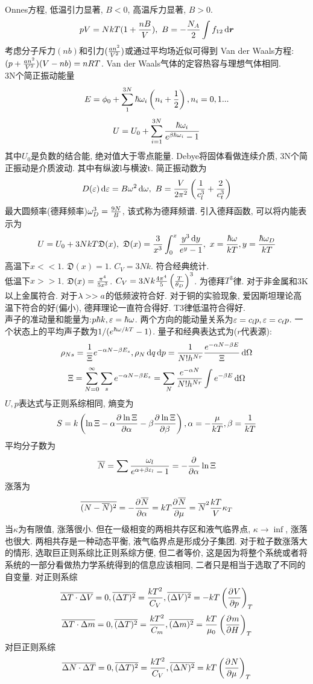 \documentclass[UTF8,9pt]{ctexart}
\newcommand{\q}[1]{{\color{red} #1}}
\begin{document}
Onnes方程, 低温引力显著, $B<0$, 高温斥力显著, $B>0$. 
$$pV=NkT(1+\frac{nB}{V}),\ B=-\frac{N_A}{2}\int f_{12}\mathop{}\!\mathrm{d}\bm{r}$$
考虑分子斥力$(nb)$和引力$(\frac{an^2}{V^2})$或通过平均场近似可得到\q{Van der Waals方程}: $(p+\frac{an^2}{V^2})(V-nb)=nRT$. Van der Waals气体的定容热容与理想气体相同. \\
3N个简正振动能量
$$E=\phi_0+\sum_1^{3N}\hbar\omega_i\left( n_i+\frac{1}{2} \right),n_i=0,1...$$
$$U=U_0+\sum_{i=1}^{3N}\frac{\hbar\omega_i}{e^{\beta\hbar\omega_i}-1}$$
其中$U_0$是负数的结合能, 绝对值大于零点能量. 
Debye将固体看做连续介质, 3N个简正振动是介质波动. 其中有纵波l与横波t. 简正振动数为
$$D(\ep)\d\ep=B\o^2\d\o,\ B=\f{V}{2\pi^2}\of{\ff{c_l^3}+\f{2}{c^3_t}}$$
最大圆频率(德拜频率)$\omega_D^3=\frac{9N}{B}$, 该式称为德拜频谱. 引入德拜函数, 可以将内能表示为
$$U=U_0+3NkT\mathfrak{D}(x),\ \mathfrak{D}(x)=\f{3}{x^3}\int_0^x\f{y^3\d y}{e^y-1},\ x=\f{\hbar\o}{kT},y=\f{\hbar\o_D}{kT}$$
高温下$x<<1$. $\mathfrak{D}(x)=1$. $C_V=3Nk$. 符合经典统计. \\
低温下$x>>1$. $\mathfrak{D}(x)=\frac{\pi^4}{5x^3}$. $C_V=3Nk\frac{4\pi^4}{5}\left( \frac{T}{\theta_D} \right)^3$. 为德拜$T^3$律. 对于非金属和3K以上金属符合. 对于$\lambda>>a$的低频波符合好. 对于铜的实验现象, 爱因斯坦理论高温下符合的好(偏小), 德拜理论一直符合得好. T3律低温符合得好. \\
声子的准动量和能量为:$p\hbar k,\varepsilon=\hbar\omega$. 两个方向的能动量关系为$\varepsilon=c_lp,\varepsilon=c_tp$. 一个状态上的平均声子数为$1/(e^{\hbar\omega/kT}-1)$.
量子和经典表达式为($r$代表源):
$$\rho_{Ns}=\frac{1}{\Xi}e^{-\alpha N-\beta E_s},\rho_N\mathop{}\!\mathrm{d} q\mathop{}\!\mathrm{d} p=\frac{1}{N!h^{Nr}}\frac{e^{-\alpha N-\beta E}}{\Xi}\mathop{}\!\mathrm{d}\Omega$$
$$\Xi=\sum_{N=0}^\infty\sum_s e^{-\alpha N-\beta E_s}=\sum_N\frac{e^{-\alpha N}}{N!h^{Nr}}\int e^{-\beta E}\mathop{}\!\mathrm{d}\Omega$$
$U,p$表达式与正则系综相同, 熵变为
$$S = k\left( \ln \Xi-\alpha\frac{\partial^{} \ln \Xi}{\partial {\alpha}^{}}-\beta\frac{\partial^{} \ln \Xi}{\partial {\beta}^{}} \right),\alpha=-\frac{\mu}{kT},\beta=\frac{1}{kT}$$
平均分子数为
$$\overline{N} = \sum \frac{\omega_l}{e^{\alpha+\beta\varepsilon_l}-1}=-\frac{\partial^{} }{\partial {\alpha}^{}}\ln\Xi$$
涨落为
$$\overline{(N-\overline{N})^2}=-\frac{\partial^{} \overline{N}}{\partial {\alpha}^{}}=kT\frac{\partial^{} \overline{N}}{\partial {\mu}^{}}=\overline{N}^2\frac{kT}{V}\kappa_T$$
当$\kappa$为有限值, 涨落很小. 但在一级相变的两相共存区和液气临界点, $\kappa\to\inf$, 涨落也很大. 两相共存是一种动态平衡, 液气临界点是形成分子集团. 对于粒子数涨落大的情形, 选取巨正则系综比正则系综方便, 但二者等价, 这是因为将整个系统或者将系统的一部分看做热力学系统得到的信息应该相同, 二者只是相当于选取了不同的自变量. 
对正则系综
$$\overline{\Delta T\cdot\Delta V}=0,\overline{(\Delta T)^2}=\frac{kT^2}{C_V},\overline{(\Delta V)^2}=-kT\left( \frac{\partial^{} V}{\partial {p}^{}} \right)_T$$
$$\overline{\Delta T\cdot\Delta m}=0,\overline{(\Delta T)^2}=\frac{kT^2}{C_m},\overline{(\Delta m)^2}=\frac{kT}{\mu_0}\left( \frac{\partial^{} m}{\partial {H}^{}} \right)_T$$
对巨正则系综
$$\overline{\Delta N\cdot\Delta T}=0,\overline{(\Delta T)^2}=\frac{kT^2}{C_V},\overline{(\Delta N)^2}=kT\left( \frac{\partial^{} N}{\partial {\mu}^{}} \right)_T$$
\end{document}
